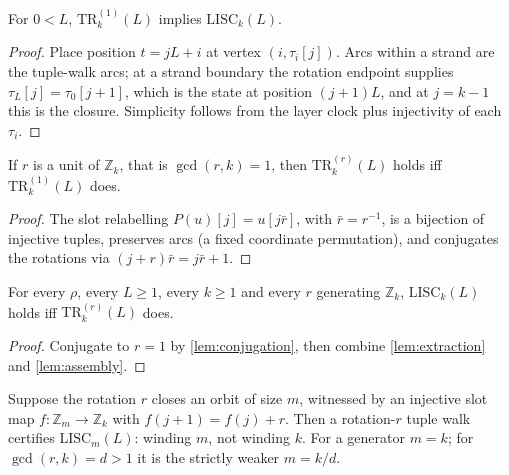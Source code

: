 \begin{lemma}
\label{lem:assembly}
\leanok
{}
For $0 < L$, $\mathrm{TR}_k^{(1)}(L)$ implies $\mathrm{LISC}_k(L)$.
\end{lemma}

\begin{proof}
\leanok
{}
Place position $t = jL+i$ at vertex $(i, \tau_i[j])$. Arcs within a strand are
the tuple-walk arcs; at a strand boundary the rotation endpoint supplies
$\tau_L[j] = \tau_0[j+1]$, which is the state at position $(j+1)L$, and at
$j = k-1$ this is the closure. Simplicity follows from the layer clock plus
injectivity of each $\tau_i$.
\end{proof}

\begin{lemma}
\label{lem:conjugation}
\leanok
{}
If $r$ is a unit of $\mathbb{Z}_k$, that is $\gcd(r,k)=1$, then
$\mathrm{TR}_k^{(r)}(L)$ holds iff $\mathrm{TR}_k^{(1)}(L)$ does.
\end{lemma}

\begin{proof}
\leanok
{}
The slot relabelling $P(u)[j] = u[j\bar r]$, with $\bar r = r^{-1}$, is a
bijection of injective tuples, preserves arcs (a fixed coordinate permutation),
and conjugates the rotations via $(j+r)\bar r = j\bar r + 1$.
\end{proof}

\begin{theorem}
\label{thm:pruning}
\leanok
{}
For every $\rho$, every $L \geq 1$, every $k \geq 1$ and every $r$ generating
$\mathbb{Z}_k$, $\mathrm{LISC}_k(L)$ holds iff $\mathrm{TR}_k^{(r)}(L)$ does.
\end{theorem}

\begin{proof}
\leanok
{}
Conjugate to $r=1$ by \ref{lem:conjugation}, then combine \ref{lem:extraction}
and \ref{lem:assembly}.
\end{proof}

\begin{lemma}
\label{lem:ng}
\leanok
{}
Suppose the rotation $r$ closes an orbit of size $m$, witnessed by an injective
slot map $f : \mathbb{Z}_m \to \mathbb{Z}_k$ with $f(j+1) = f(j) + r$. Then a
rotation-$r$ tuple walk certifies $\mathrm{LISC}_m(L)$: winding $m$, not
winding $k$. For a generator $m = k$; for $\gcd(r,k) = d > 1$ it is the
strictly weaker $m = k/d$.
\end{lemma}


